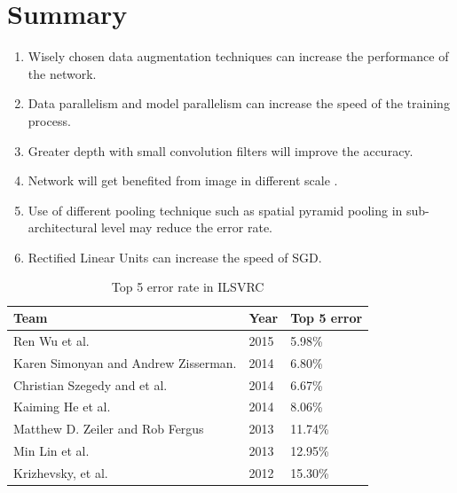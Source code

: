 \documentclass{article}
\begin{document}
 \section {Summary}
 \begin{enumerate}
 
 \item Wisely chosen data  augmentation techniques can increase the performance of the network.
 \item Data parallelism and model parallelism can increase the speed of the training process.
 \item Greater depth with small convolution filters will improve the accuracy.
 \item Network will get benefited from   image  in different scale .
 \item Use of different pooling technique such as spatial pyramid pooling in sub-architectural  level may reduce the error rate. 
 \item  Rectified Linear Units can increase the speed of SGD.
 
 
 \end{enumerate}
 
 \begin{table}[h]
 \begin{tabular}{ | p{5cm} | l | l |}
    \hline
Team	&Year	&Top 5 error\\
    \hline
        \hline
Ren Wu et al.\cite{Wu2015}	&2015	&5.98\%\\
    \hline
Karen Simonyan and Andrew Zisserman.\cite{Arge2015}	&2014	&6.80\%\\
    \hline
Christian Szegedy and et al.\cite{Szegedy}	&2014	&6.67\%\\
    \hline
Kaiming He et al.\cite{He2014}	&2014	&8.06\%\\
    \hline
Matthew D. Zeiler and Rob Fergus \cite{Zeiler2013}	&2013	&11.74\%\\
    \hline
Min Lin et al.\cite{Lin2013}	&2013	&12.95\%\\
    \hline
Krizhevsky, et al.\cite{Krizhevsky2012a}	&2012	&15.30\%\\
    \hline

\end{tabular}
\caption[]{ Top 5 error rate in ILSVRC}
\end{table}
\end{document}
